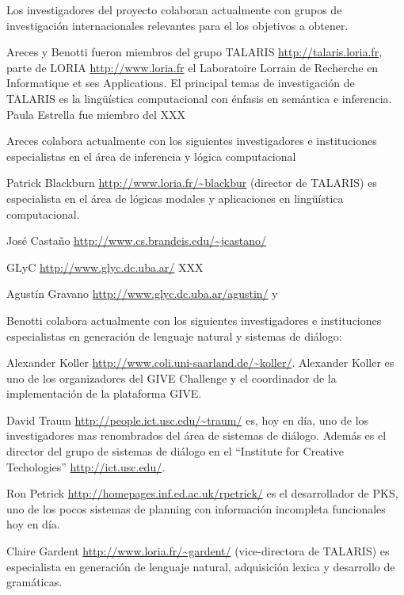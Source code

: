 Los investigadores del proyecto colaboran actualmente
con grupos de investigaci\'on internacionales relevantes para
el los objetivos a obtener.

Areces y Benotti fueron miembros
del grupo TALARIS \url{http://talaris.loria.fr}, parte de
LORIA \url{http://www.loria.fr} el Laboratoire Lorrain de Recherche en Informatique et ses Applications. El principal temas de investigaci\'on de TALARIS es la ling\"u\'istica
computacional con \'enfasis en sem\'antica e inferencia.  Paula Estrella
fue miembro del XXX 

Areces colabora actualmente con los siguientes investigadores e instituciones especialistas en el \'area de inferencia y l\'ogica
computacional
\begin{myitemize}
\item Patrick Blackburn \url{http://www.loria.fr/~blackbur} (director de TALARIS) es especialista en el \'area de l\'ogicas modales y aplicaciones
en ling\"u\'istica computacional.

\item Jos\'e Casta\~no \url{http://www.cs.brandeis.edu/~jcastano/}

\item GLyC \url{http://www.glyc.dc.uba.ar/} XXX

\item Agust\'in Gravano \url{http://www.glyc.dc.uba.ar/agustin/} y
\end{myitemize}



Benotti colabora actualmente con los siguientes investigadores e instituciones
especialistas en generaci\'on de lenguaje natural y sistemas de di\'alogo:

\begin{myitemize}
\item Alexander Koller \url{http://www.coli.uni-saarland.de/~koller/}.
Alexander Koller es uno de los organizadores del GIVE Challenge y el
coordinador de la implementaci\'on de la plataforma GIVE.

\item David Traum \url{http://people.ict.usc.edu/~traum/} es, hoy en d\'ia, uno
de los investigadores mas renombrados del \'area de sistemas de di\'alogo.
Adem\'as es el director del grupo de sistemas de di\'alogo en el ``Institute
for Creative Techologies'' \url{http://ict.usc.edu/}.

\item Ron Petrick \url{http://homepages.inf.ed.ac.uk/rpetrick/} es el
desarrollador de PKS, uno de los pocos sistemas de planning con informaci\'on
incompleta funcionales hoy en d\'ia.

\item Claire Gardent \url{http://www.loria.fr/~gardent/} (vice-directora de
TALARIS) es especialista en generaci\'on de lenguaje natural, adquisici\'on
lexica y desarrollo de gram\'aticas.
\end{myitemize}

